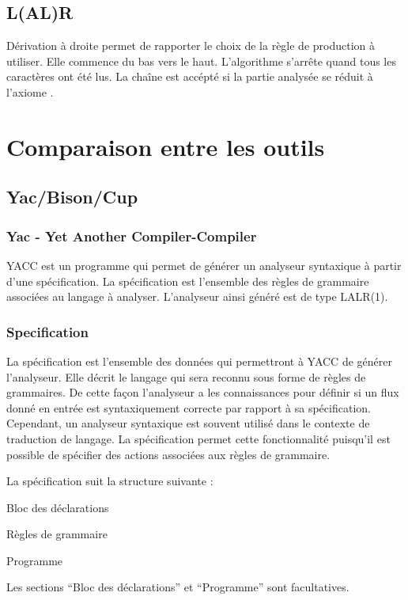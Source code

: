 \documentclass{article}
\begin{document}
\subsection{L(AL)R}
Dérivation à droite permet de rapporter le choix de la règle de production à utiliser.
Elle commence du bas vers le haut.
L’algorithme s’arrête quand tous les caractères ont été lus. La chaîne est accépté si la partie analysée se réduit à l’axiome 
\cite{refModernCompiler}.

\section{Comparaison entre les outils}
\label{hints}

\subsection{Yac/Bison/Cup}


\subsubsection{Yac - Yet Another Compiler-Compiler}
YACC est un programme qui permet de générer un analyseur syntaxique à partir d’une spécification. La spécification est l’ensemble des règles de grammaire associées au langage à analyser.
L’analyseur ainsi généré est de type LALR(1).

\subsubsection{Specification}
La spécification est l’ensemble des données qui permettront à YACC de générer l’analyseur. Elle décrit le langage qui sera reconnu sous forme de règles de grammaires. De cette façon l’analyseur a les connaissances pour définir si un flux donné en entrée est syntaxiquement correcte par rapport à sa spécification.
Cependant, un analyseur syntaxique est souvent utilisé dans le contexte de traduction de langage. La spécification permet cette fonctionnalité puisqu’il est possible de spécifier des actions associées aux règles de grammaire.

La spécification suit la structure suivante :

Bloc des déclarations


Règles de grammaire


Programme

Les sections “Bloc des déclarations” et “Programme” sont facultatives.
\end{document}
